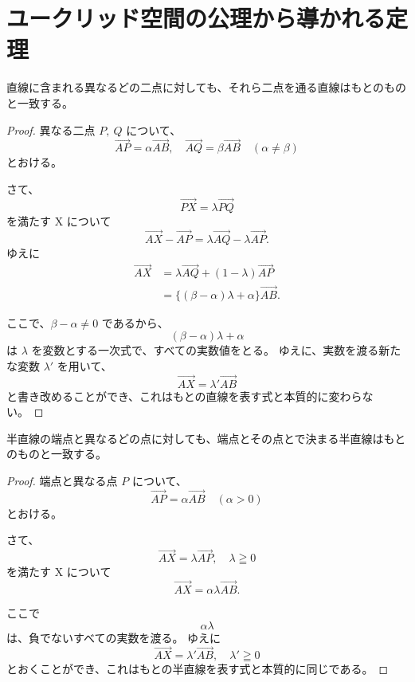 \chapter{ユークリッド空間の公理から導かれる定理}

\begin{thm}\label{theorem:16}
  直線に含まれる異なるどの二点に対しても、それら二点を通る直線はもとのものと一致する。
\end{thm}

\begin{proof}
  異なる二点 \(P,\ Q\) について、
  \[\overrightarrow{AP}=\alpha\overrightarrow{AB},\quad \overrightarrow{AQ}=\beta\overrightarrow{AB} \quad (\alpha\neq\beta)\]
  とおける。

  さて、
  \[\overrightarrow{PX}=\lambda\overrightarrow{PQ}\]
  を満たす X について
  \[\overrightarrow{AX}-\overrightarrow{AP}=\lambda\overrightarrow{AQ}-\lambda\overrightarrow{AP}.\]
  ゆえに
  \begin{align*}
    \overrightarrow{AX} &= \lambda\overrightarrow{AQ}+(1-\lambda)\overrightarrow{AP} \\
                        &= \{(\beta-\alpha)\lambda+\alpha\}\overrightarrow{AB}.
  \end{align*}

  ここで、\(\beta-\alpha\neq0\) であるから、
  \[(\beta-\alpha)\lambda+\alpha\]
  は \(\lambda\) を変数とする一次式で、すべての実数値をとる。
  ゆえに、実数を渡る新たな変数 \(\lambda'\) を用いて、
  \[\overrightarrow{AX}=\lambda'\overrightarrow{AB}\]
  と書き改めることができ、これはもとの直線を表す式と本質的に変わらない。
\end{proof}

\begin{thm}\label{theorem:17}
  半直線の端点と異なるどの点に対しても、端点とその点とで決まる半直線はもとのものと一致する。
\end{thm}

\begin{proof}
  端点と異なる点 \(P\) について、
  \[\overrightarrow{AP}=\alpha\overrightarrow{AB} \quad (\alpha>0)\]
  とおける。

  さて、
  \[\overrightarrow{AX}=\lambda\overrightarrow{AP},\quad \lambda\geqq0\]
  を満たす X について
  \[\overrightarrow{AX}=\alpha\lambda\overrightarrow{AB}.\]

  ここで
  \[\alpha\lambda\]
  は、負でないすべての実数を渡る。
  ゆえに
  \[\overrightarrow{AX}=\lambda'\overrightarrow{AB},\quad \lambda'\geqq0\]
  とおくことができ、これはもとの半直線を表す式と本質的に同じである。
\end{proof}

